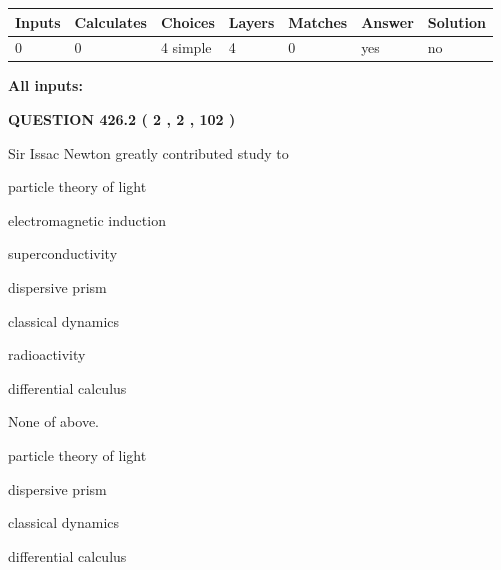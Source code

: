 \documentclass[12pt]{article}
\begin{document}
 
   
   
   
   
\noindent\begin{tabular}{|l|l|l|l|l|l|l|}
 \hline
Inputs & Calculates & Choices & Layers & Matches & Answer & Solution \\ \hline
 0  & 
 0  & 
 4
  simple  
  & 
 4  & 
 0  & 
  yes & 
  no 
  \\ \hline
 \end{tabular}
   
   
   
   
\noindent{}
   
   
   
   
\noindent\vspace{0.1in}\hspace{-0.08in} {\textbf{\Large{All inputs: }}}
   
   
  
\vspace{0.2in}
  
{\textbf{\Large{QUESTION
426.2 
 ( 2 , 2 , 102 )
}}}
  
  
Sir Issac Newton greatly contributed study to
 
 
particle theory of light
 
 
electromagnetic induction
 
 
superconductivity
 
 
dispersive prism
 
 
classical dynamics
 
 
radioactivity
 
 
differential calculus
 
 
 None of above.
 
 
\noindent{}
 
 
particle theory of light
 
 
dispersive prism
 
 
classical dynamics
 
 
differential calculus
 
\end{document}
